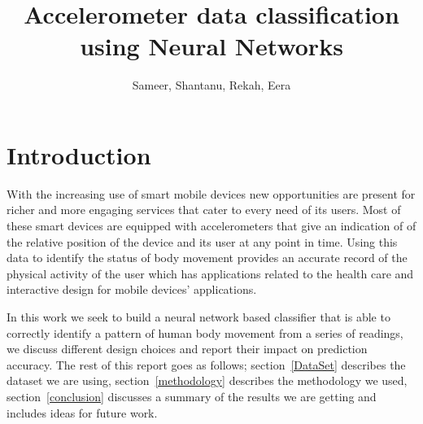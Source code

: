 \documentclass{article}
\begin{document}
\title{Accelerometer data classification using Neural Networks}
\author{ Sameer, Shantanu, Rekah, Eera}

\tableofcontents
\pagebreak
\listoffigures

\pagebreak


\maketitle



\section{Introduction}
\label{introduction}

With the increasing use of smart mobile devices new opportunities are present for richer and more engaging services 
that cater to every need of its users. Most of these smart devices are equipped with accelerometers that give an
indication of of the relative position of the device and its user at any point in time. Using this data to identify the 
status of body movement provides an accurate record of the physical activity of the user which has applications related 
to the health care and interactive design for mobile devices' applications. 

In this work we seek to build a neural network based classifier that is able to correctly identify a pattern of human body 
movement from a series of readings, we discuss different design choices and report their impact on prediction accuracy. The 
rest of this report goes as follows; section~\ref{DataSet} describes the dataset we are using, section~\ref{methodology} describes 
the methodology we used, section~\ref{conclusion} discusses a summary of the results we are getting and includes ideas for future work.
\end{document}
